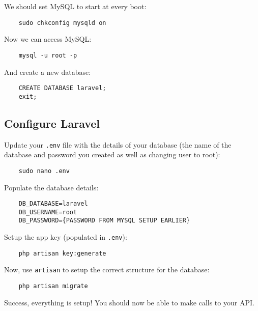\pagebreak

We should set MySQL to start at every boot:

\begin{verbatim}
    sudo chkconfig mysqld on
\end{verbatim}

Now we can access MySQL:

\begin{verbatim}
    mysql -u root -p
\end{verbatim}

And create a new database:

\begin{verbatim}
    CREATE DATABASE laravel;
    exit;
\end{verbatim}

\subsection{Configure Laravel}

Update your \texttt{.env} file with the details of your database (the name of the database and password you created as well as changing user to root):

\begin{verbatim}
    sudo nano .env
\end{verbatim}

Populate the database details:

\begin{verbatim}
    DB_DATABASE=laravel
    DB_USERNAME=root
    DB_PASSWORD={PASSWORD FROM MYSQL SETUP EARLIER}
\end{verbatim}

Setup the app key (populated in \texttt{.env}):

\begin{verbatim}
    php artisan key:generate
\end{verbatim}

Now, use \texttt{artisan} to setup the correct structure for the database:

\begin{verbatim}
    php artisan migrate
\end{verbatim}

Success, everything is setup! You should now be able to make calls to your API.

\pagebreak

